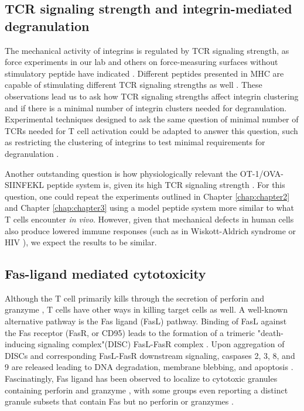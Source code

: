 \subsection{TCR signaling strength and integrin-mediated degranulation}

The mechanical activity of integrins is regulated by TCR signaling strength, as  force experiments in our lab and others on force-measuring surfaces without stimulatory peptide have indicated \cite{Ma2012, Feng2018, Chen2013, Harrison2019}. Different peptides presented in MHC are capable of stimulating different TCR signaling strengths as well \cite{Moran2011}. These observations lead us to ask how TCR signaling strengths affect integrin clustering and if there is a minimal number of integrin clusters needed for degranulation. Experimental techniques designed to ask the same question of minimal number of TCRs needed for T cell activation could be adapted to answer this question, such as restricting the clustering of integrins to test minimal requirements for degranulation \cite{Hashimoto-Tane2016, Labrecque2001, Manz2011}. 

Another outstanding question is how physiologically relevant the OT-1/OVA-SIINFEKL peptide system is, given its high TCR signaling strength \cite{Moran2011}. For this question, one could repeat the experiments outlined in Chapter \ref{chap:chapter2} and Chapter \ref{chap:chapter3} using a model peptide system more similar to what T cells encounter \textit{in vivo}. However, given that mechanical defects in human cells also produce lowered immune responses (such as in Wiskott-Aldrich syndrome or HIV \cite{Houmadi2018}), we expect the results to be similar.

\subsection{Fas-ligand mediated cytotoxicity}

Although the T cell primarily kills through the secretion of perforin and granzyme \cite{Yasukawa2000}, T cells have other ways in killing target cells as well. A well-known alternative pathway is the Fas ligand (FasL) pathway.  Binding of FasL against the Fas receptor (FasR, or CD95) leads to the formation of a trimeric "death-inducing signaling complex"(DISC) FasL-FasR complex \cite{Yamada2017}. Upon aggregation of DISCs and corresponding FasL-FasR downstream signaling,  caspases 2, 3, 8, and 9 are released leading to DNA degradation, membrane blebbing, and apoptosis \cite{Parlato2000, Yamada2017}. Fascinatingly, Fas ligand has been observed to localize to cytotoxic granules containing perforin and granzyme \cite{Kojima2002}, with some groups even reporting a distinct granule subsets that contain Fas but no perforin or granzymes \cite{Chang2017, Schmidt2011, Schmidt2011_2}. 

